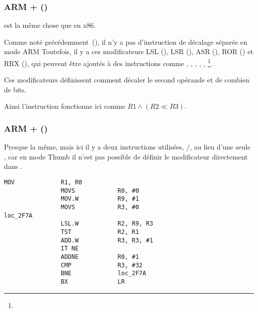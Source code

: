 \subsubsection{ARM + \OptimizingXcodeIV (\ARMMode)}



\TST est la même chose que \TEST en x86.

Comme noté précédemment~(), il n'y a pas d'instruction
de décalage séparée en mode ARM
Toutefois, il y a ces modificateurs
LSL (), 
LSR (), 
ASR (), 
ROR () et
RRX (),
qui peuvent être ajoutés à des instructions comme \MOV, \TST,
\CMP, \ADD, \SUB, \RSB\footnote{\DataProcessingInstructionsFootNote}.

Ces modificateurs définissent comment décaler le second opérande et de combien de
bits.

Ainsi l'instruction  fonctionne ici comme $R1 \land (R2
\ll R3)$.

\subsubsection{ARM + \OptimizingXcodeIV (\ThumbTwoMode)}

Presque la même, mais ici il y a deux instructions utilisées, /\TST, au
lieu d'une seule \TST, car en mode Thumb il n'est pas possible de définir le modificateur
\LSL directement dans \TST.

\begin{lstlisting}[label=ARM_leaf_example5,style=customasmARM]
                MOV             R1, R0
                MOVS            R0, #0
                MOV.W           R9, #1
                MOVS            R3, #0
loc_2F7A
                LSL.W           R2, R9, R3
                TST             R2, R1
                ADD.W           R3, R3, #1
                IT NE
                ADDNE           R0, #1
                CMP             R3, #32
                BNE             loc_2F7A
                BX              LR
\end{lstlisting}

